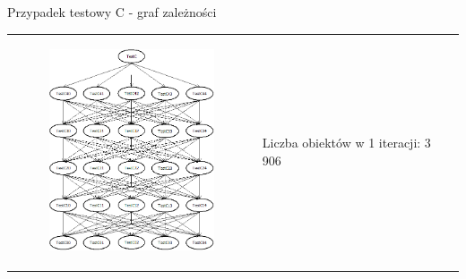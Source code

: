 \documentclass{beamer}
\begin{document}
\begin{frame}{Przypadek testowy C - graf zależności}
\begin{table}
     \begin{small}
	\begin{tabular}{ p{7cm} p{2cm} }
	
	\begin{minipage}{.7\textwidth}
\begin{figure}
	\begin{center}
  		\includegraphics[height=6cm]{TestC.png}
	\end{center}
\end{figure}
   	 \end{minipage}
&
	\begin{minipage}{.3\textwidth}
\tiny{Liczba obiektów w 1 iteracji: 3 906}
   	 \end{minipage}

	\end{tabular}
     \end{small}
\end{table}
\end{frame}
\end{document}
